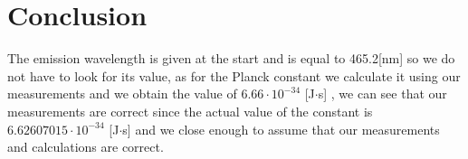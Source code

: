 \section{Conclusion}

The emission wavelength is given at the start and is equal to 465.2[nm] so we do not have to look for its
value, as for the Planck constant we calculate it using our measurements and we obtain the value of
$6.66 \cdot 10^{-34}$ [J$\cdot$s] , we can see that our measurements are correct since the actual
value of the constant is  $6.62607015 \cdot 10^{-34}$ [J$\cdot$s] and we close enough to assume that our measurements and calculations are correct.